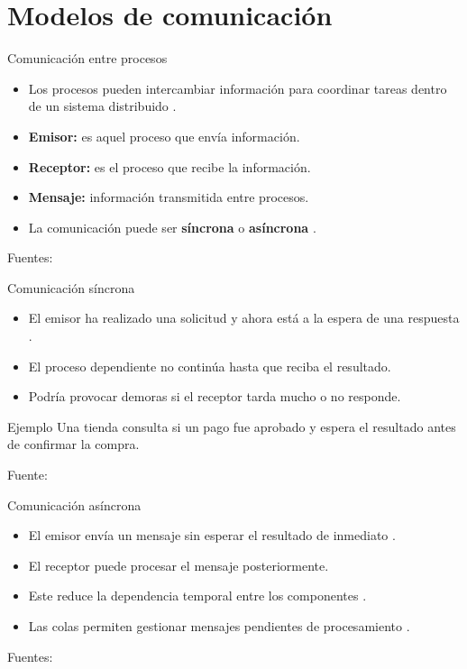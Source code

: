 
\section{Modelos de comunicación}

\begin{frame}{Comunicación entre procesos}
  \begin{itemize}
    \item Los procesos pueden intercambiar información para coordinar tareas dentro de un sistema distribuido \cite{kazanavicius2023}.
    \item \textbf{Emisor:} es aquel proceso que envía información.
    \item \textbf{Receptor:} es el proceso que recibe la información.
    \item \textbf{Mensaje:} información transmitida entre procesos.
    \item La comunicación puede ser \textbf{síncrona} o \textbf{asíncrona} \cite{kazanavicius2023}.
  \end{itemize}

  {\tiny Fuentes: \cite{kazanavicius2023,zhang2023}}
\end{frame}

\begin{frame}{Comunicación síncrona}
  \begin{itemize}
    \item El emisor ha realizado una solicitud y ahora está a la espera de una respuesta \cite{kazanavicius2023}.
    \item El proceso dependiente no continúa hasta que reciba el resultado.
    \item Podría provocar demoras si el receptor tarda mucho o no responde.
  \end{itemize}

  \vspace{0.3cm}
  \begin{block}{Ejemplo}
    Una tienda consulta si un pago fue aprobado y espera el resultado antes de confirmar la compra.
  \end{block}

  {\tiny Fuente: \cite{kazanavicius2023}}
\end{frame}

\begin{frame}{Comunicación asíncrona}
  \begin{itemize}
    \item El emisor envía un mensaje sin esperar el resultado de inmediato \cite{maharjan2023}.
    \item El receptor puede procesar el mensaje posteriormente.
    \item Este reduce la dependencia temporal entre los componentes \cite{kazanavicius2023}.
    \item Las colas permiten gestionar mensajes pendientes de procesamiento \cite{derlatka2023}.
  \end{itemize}

  {\tiny Fuentes: \cite{maharjan2023,derlatka2023,kazanavicius2023}}
\end{frame}

